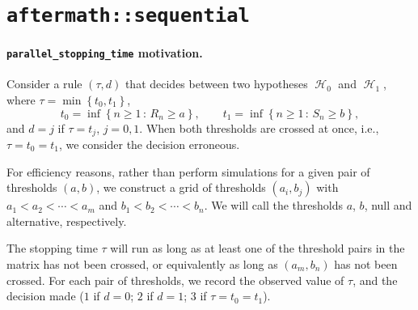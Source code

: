 \documentclass{article}
\renewcommand{\geq}{\geqslant}
\newcommand{\set}[1]{\left\{ #1 \right\}}
\newcommand{\cset}[3][:]{\left\{#2 \,#1\, #3\right\}}
\DeclareMathOperator{\Hyp}{\mathcal{H}}
\begin{document}
\section*{\texttt{aftermath::sequential}}

\paragraph*{\texttt{parallel\_stopping\_time} motivation.}
Consider a rule $(\tau, d)$ that decides between two hypotheses $\Hyp_0$ and $\Hyp_1$, where $\tau = \min\set{t_0, t_1}$,
\[
    t_0 = \inf\cset{n \geq 1}{R_n \geq a},
    \qquad
    t_1 = \inf\cset{n \geq 1}{S_n \geq b},
\]
and $d = j$ if $\tau = t_j$, $j = 0, 1$.
When both thresholds are crossed at once, i.e., $\tau = t_0 = t_1$, we consider the decision erroneous.

For efficiency reasons, rather than perform simulations for a given pair of thresholds $(a, b)$, we construct a grid of thresholds $(a_i, b_j)$ with $a_1 < a_2 < \cdots < a_m$ and $b_1 < b_2 < \cdots < b_n$.
We will call the thresholds $a$, $b$, null and alternative, respectively.
\begin{center}
\end{center}

The stopping time $\tau$ will run as long as at least one of the threshold pairs in the matrix has not been crossed, or equivalently as long as $(a_m, b_n)$ has not been crossed. For each pair of thresholds, we record the observed value of $\tau$, and the decision made ($1$ if $d = 0$; $2$ if $d = 1$; $3$ if $\tau = t_0 = t_1$).
\end{document}
